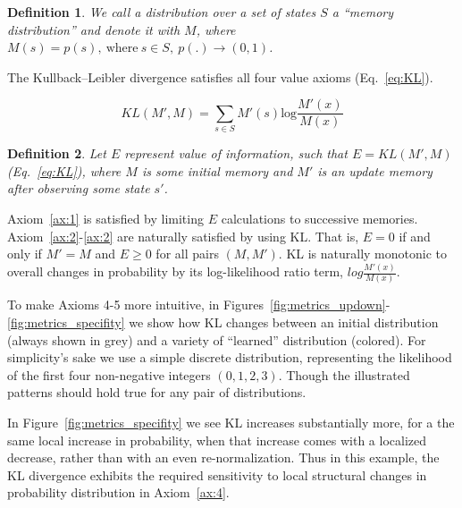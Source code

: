 \documentclass[9pt,twocolumn,twoside]{pnas-new}
\newtheorem{definition}{Definition}
\begin{document}
\begin{definition}
    We call a distribution over a set of states $S$ a ``memory distribution'' and denote it with $M$, where $M(s) = p(s), \ \text{where} \ s \in S, \ p(.) \rightarrow (0, 1)$.
\end{definition}

The Kullback--Leibler divergence satisfies all four value axioms (Eq.~\ref{eq:KL}). 

\begin{equation}
    KL(M', M) = \sum_{s \in S} M'(s) \text{log} \frac{M'(x)}{M(x)} 
    \label{eq:KL}
\end{equation}

\begin{definition}
    Let $E$ represent value of information, such that $E = KL(M', M)$ (Eq.~\ref{eq:KL}), where $M$ is some initial memory and $M'$ is an update memory after observing some state $s'$.
\end{definition}

Axiom~\ref{ax:1} is satisfied by limiting $E$ calculations to successive memories. Axiom~\ref{ax:2}-\ref{ax:2} are naturally satisfied by using KL. That is, $E = 0$ if and only if $M' = M$ and $E \geq 0$ for all pairs $(M, M')$. KL is naturally monotonic to overall changes in probability by its log-likelihood ratio term, $log \frac{M'(x)}{M(x)}$. 

To make Axioms 4-5 more intuitive, in Figures~\ref{fig:metrics_updown}-\ref{fig:metrics_specifity} we show how KL changes between an initial distribution (always shown in grey) and a variety of ``learned'' distribution (colored). For simplicity's sake we use a simple discrete distribution, representing the likelihood of the first four non-negative integers $(0,1,2,3)$. Though the illustrated patterns should hold true for any pair of distributions.

In Figure~\ref{fig:metrics_specifity} we see KL increases substantially more, for a the same local increase in probability, when that increase comes with a localized decrease, rather than with an even re-normalization. Thus in this example, the KL divergence exhibits the required sensitivity to local structural changes in probability distribution in Axiom~\ref{ax:4}.
\end{document}

